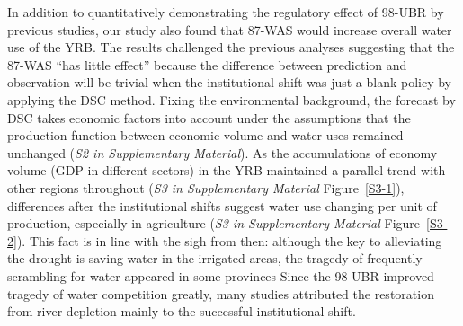 
\label{discussion-1}
In addition to quantitatively demonstrating the regulatory effect of 98-UBR by previous studies, our study also found that 87-WAS would increase overall water use of the YRB.
The results challenged the previous analyses suggesting that the 87-WAS ``has little effect'' because the difference between prediction and observation will be trivial when the institutional shift was just a blank policy by applying the DSC method. %
Fixing the environmental background, the forecast by DSC takes economic factors into account under the assumptions that the production function between economic volume and water uses remained unchanged (\textit{S2 in Supplementary Material}).
As the accumulations of economy volume (GDP in different sectors) in the YRB maintained a parallel trend with other regions throughout (\textit{S3 in Supplementary Material} Figure~\ref{S3-1}), differences after the institutional shifts suggest water use changing per unit of production, especially in agriculture (\textit{S3 in Supplementary Material} Figure~\ref{S3-2}).
This fact is in line with the sigh from then: although the key to alleviating the drought is saving water in the irrigated areas, the tragedy of frequently scrambling for water appeared in some provinces %
Since the 98-UBR improved tragedy of water competition greatly, many studies attributed the restoration from river depletion mainly to the successful institutional shift.

